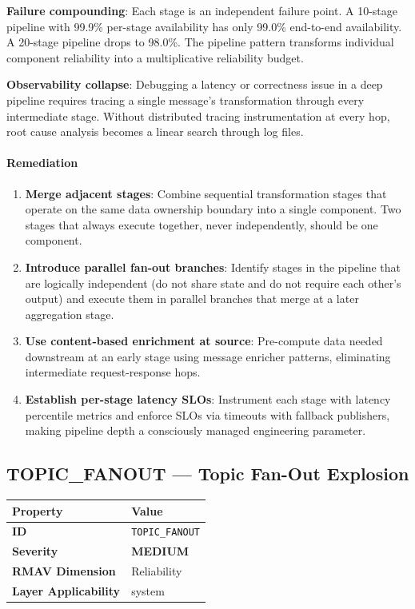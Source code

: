 \documentclass[11pt]{article}
\makeatletter
\newcommand{\MEDIUM}{\textcolor{yellow!50!black}{\textbf{MEDIUM}}}
\newcommand{\patternprop}[4]{%
  \begin{center}
  \begin{tabular}{@{}ll@{}}
  \toprule
  \textbf{Property} & \textbf{Value} \\
  \midrule
  \textbf{ID} & \texttt{#1} \\
  \textbf{Severity} & #2 \\
  \textbf{RMAV Dimension} & #3 \\
  \textbf{Layer Applicability} & #4 \\
  \bottomrule
  \end{tabular}
  \end{center}
}
\makeatother
\begin{document}
\textbf{Failure compounding}: Each stage is an independent failure point. A 10-stage pipeline with 99.9\% per-stage availability has only 99.0\% end-to-end availability. A 20-stage pipeline drops to 98.0\%. The pipeline pattern transforms individual component reliability into a multiplicative reliability budget.

\textbf{Observability collapse}: Debugging a latency or correctness issue in a deep pipeline requires tracing a single message's transformation through every intermediate stage. Without distributed tracing instrumentation at every hop, root cause analysis becomes a linear search through log files.

\paragraph{Remediation}
\begin{enumerate}[leftmargin=*]
\item \textbf{Merge adjacent stages}: Combine sequential transformation stages that operate on the same data ownership boundary into a single component. Two stages that always execute together, never independently, should be one component.
\item \textbf{Introduce parallel fan-out branches}: Identify stages in the pipeline that are logically independent (do not share state and do not require each other's output) and execute them in parallel branches that merge at a later aggregation stage.
\item \textbf{Use content-based enrichment at source}: Pre-compute data needed downstream at an early stage using message enricher patterns, eliminating intermediate request-response hops.
\item \textbf{Establish per-stage latency SLOs}: Instrument each stage with latency percentile metrics and enforce SLOs via timeouts with fallback publishers, making pipeline depth a consciously managed engineering parameter.
\end{enumerate}

\subsection{TOPIC\_FANOUT --- Topic Fan-Out Explosion}
\patternprop{TOPIC\_FANOUT}{\MEDIUM}{Reliability}{system}
\end{document}

